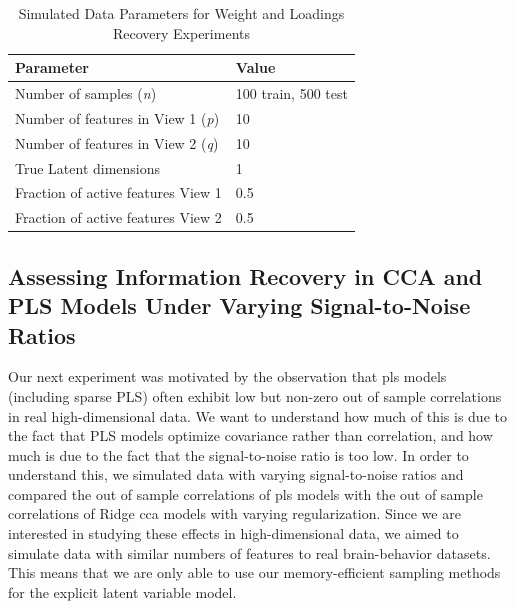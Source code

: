 \begin{table}
    \centering
    \caption{Simulated Data Parameters for Weight and Loadings Recovery Experiments}
    \begin{tabular}{| l | l |}
        \hline
        \textbf{Parameter}                        & \textbf{Value}                               \\
        \hline
        Number of samples (\textit{n})            & 100 train, 500 test                            \\
        Number of features in View 1 (\textit{p}) & 10 \\
        Number of features in View 2 (\textit{q}) & 10 \\
        True Latent dimensions                    & 1                                            \\
        Fraction of active features View 1            & 0.5                                          \\
        Fraction of active features View 2            & 0.5                                          \\
        \hline
    \end{tabular}\label{tab:simulated-data-parameters}
\end{table}

\subsection{Assessing Information Recovery in CCA and PLS Models Under Varying Signal-to-Noise Ratios}

Our next experiment was motivated by the observation that \acrshort{pls} models (including sparse PLS) often exhibit low but non-zero out of sample correlations in real high-dimensional data.
We want to understand how much of this is due to the fact that PLS models optimize covariance rather than correlation, and how much is due to the fact that the signal-to-noise ratio is too low.
In order to understand this, we simulated data with varying signal-to-noise ratios and compared the out of sample correlations of \acrshort{pls} models with the out of sample correlations of Ridge \acrshort{cca} models with varying regularization.
Since we are interested in studying these effects in high-dimensional data, we aimed to simulate data with similar numbers of features to real brain-behavior datasets.
This means that we are only able to use our memory-efficient sampling methods for the explicit latent variable model.

